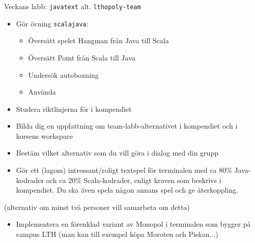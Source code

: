 


\begin{Slide}{Veckans labb: \texttt{javatext} alt. \texttt{lthopoly-team}}\SlideFontSmall
{}
\begin{itemize}
\item Gör övning \texttt{scalajava}:
\begin{itemize}\SlideFontSmall
\item Översätt spelet Hangman från Java till Scala
\item Översätt Point från Scala till Java
\item Undersök autoboxning 
\item Använda 
\end{itemize}
\item Studera riktlinjerna för  i kompendiet
\item Bilda dig en uppfattning om team-labb-alternativet  i kompendiet och i korsens workspace
\item Bestäm vilket alternativ som du vill göra  i dialog med din grupp
\end{itemize}
\begin{itemize}
\item Gör ett (lagom) intressant/roligt textspel för terminalen med ca 80\% Java-kodrader och ca 20\% Scala-kodrader, enligt kraven som beskrivs i kompendiet. Du ska även spela någon annans spel och ge återkoppling.
\end{itemize}
 (alternativ om minst två personer vill samarbeta om detta)
\begin{itemize}
\item Implementera en förenklad variant av Monopol i terminalen som bygger på campus LTH (man kan till exempel köpa Moroten och Piskan...)
\end{itemize}
\end{Slide}

